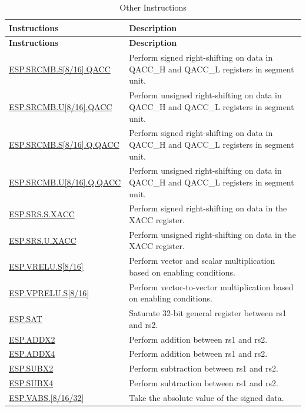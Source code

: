 \documentclass[main\_\_EN.tex]{subfiles}
\begin{document}
\begin{longtable}[c]{|l|m{11cm}|}
    \caption{Other Instructions}
    \label{tab:pie-others-instructions}\\
    \hline
    \rowcolor{lightgray}
    \textbf{Instructions} & \textbf{Description} \\\hline
    \endfirsthead
    \rowcolor{lightgray}
    \textbf{Instructions} & \textbf{Description} \\\hline
    \endhead
    \endfoot

    \hyperref[instruction:ESPSRCMBS8QACC]{ESP.SRCMB.S[8/16].QACC} & Perform signed right-shifting on data in QACC\_H and QACC\_L registers in segment unit.
    \\\hline
    \hyperref[instruction:ESPSRCMBU8QACC]{ESP.SRCMB.U[8/16].QACC} & Perform unsigned right-shifting on data in QACC\_H and QACC\_L registers in segment unit.
    \\\hline
    \hyperref[instruction:ESPSRCMBS8QQACC]{ESP.SRCMB.S[8/16].Q.QACC} & Perform signed right-shifting on data in QACC\_H and QACC\_L registers in segment unit.
    \\\hline
    \hyperref[instruction:ESPSRCMBU8QQACC]{ESP.SRCMB.U[8/16].Q.QACC} & Perform unsigned right-shifting on data in QACC\_H and QACC\_L registers in segment unit.
    \\\hline
    \hyperref[instruction:ESPSRSSXACC]{ESP.SRS.S.XACC} & Perform signed right-shifting on data in the XACC register.
    \\\hline
    \hyperref[instruction:ESPSRSUXACC]{ESP.SRS.U.XACC} & Perform unsigned right-shifting on data in the XACC register.
    \\\hline
    \hyperref[instruction:ESPVRELUS8]{ESP.VRELU.S[8/16]} & Perform vector and scalar multiplication based on enabling conditions.
    \\\hline
    \hyperref[instruction:ESPVPRELUS8]{ESP.VPRELU.S[8/16]} & Perform vector-to-vector multiplication based on enabling conditions.
    \\\hline
    \hyperref[instruction:ESPSAT]{ESP.SAT} & Saturate 32-bit general register between rs1 and rs2.
    \\\hline
    \hyperref[instruction:ESPADDX2]{ESP.ADDX2} & Perform addition between rs1 and rs2.
    \\\hline
    \hyperref[instruction:ESPADDX4]{ESP.ADDX4} & Perform addition between rs1 and rs2.
    \\\hline
    \hyperref[instruction:ESPSUBX2]{ESP.SUBX2} & Perform subtraction between rs1 and rs2.
    \\\hline
    \hyperref[instruction:ESPSUBX4]{ESP.SUBX4} & Perform subtraction between rs1 and rs2.
    \\\hline
    \hyperref[instruction:ESPVABS8]{ESP.VABS.[8/16/32]} & Take the absolute value of the signed data.
    \\\hline

\end{longtable}
\end{document}
